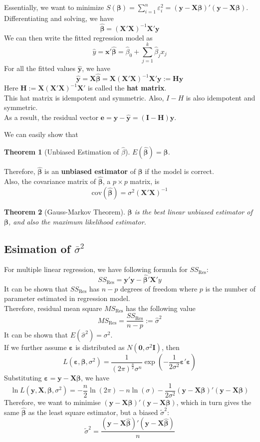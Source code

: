 \documentclass[11pt]{article}
\newcommand{\cov}{\mathrm{cov}}
\newtheorem{theorem}{Theorem}[section]
\theoremstyle{definition}
\begin{document}
Essentially, we want to minimize $S(\bm{\beta})=\sum_{i=1}^n \varepsilon_i^2 = (\bm{y}-\bm{X\beta})'(\bm{y}-\bm{X\beta})$. Differentiating and solving, we have
\[
\hat{\bm{\beta}} = (\bm{X}'\bm{X})^{-1}\bm{X}'\bm{y}
\]
We can then write the fitted regression model as
\[
\hat{y} = \bm{x}'\bm{\hat{\beta}} = \hat{\beta}_0+\sum_{j=1}^k \hat{\beta}_jx_j
\]
For all the fitted values $\bm{\hat{y}}$, we have
\[
\bm{\hat{y}} = \bm{X\hat{\beta}} = \bm{X}(\bm{X}'\bm{X})^{-1}\bm{X}'\bm{y} :=\bm{Hy}
\]
Here $\bm{H}:=\bm{X}(\bm{X}'\bm{X})^{-1}\bm{X}'$ is called the \textbf{hat matrix}.\\
This hat matrix is idempotent and symmetric. Also, $I-H$ is also idempotent and symmetric.\\

As a result, the residual vector $\bm{e}=\bm{y}-\bm{\hat{y}} = (\bm{I}-\bm{H})\bm{y}$.

We can easily show that 
\begin{theorem}[Unbiased Estimation of {$\hat{\beta}$}]
\normalfont $E(\bm{\hat{\beta}})=\bm{\beta}$. 
\end{theorem}
Therefore, $\bm{\hat{\beta}}$ is an \textbf{unbiased estimator} of $\bm{\beta}$ if the model is correct.\\
Also, the covariance matrix of $\bm{\hat{\beta}}$, a $p\times p$ matrix, is
\[
\cov(\bm{\hat{\beta}}) = \sigma^2(\bm{X}'\bm{X})^{-1}
\]
\begin{theorem}[Gauss-Markov Theorem]
\normalfont $\bm{\hat{\beta}}$  is the best linear unbiased estimator of $\bm{\beta}$, and also the maximum likelihood estimator.
\end{theorem}
\subsection{Esimation of {$\bar{\sigma}^2$}}
For multiple linear regression, we have following formula for $SS_\text{Res}$:
\[
SS_\text{Res}=\bm{y}'\bm{y}-\hat{\bm{\beta}}'\bm{X}'y
\]
It can be shown that $SS_\text{Res}$ has $n-p$ degrees of freedom where $p$ is the number of parameter estimated in regression model.\\
Therefore, residual mean square $MS_\text{Res}$ has the following value
\[
MS_\text{Res}=\frac{SS_\text{Res}}{n-p}:=\hat{\sigma}^2
\]
It can be shown that $E(\hat{\sigma}^2)=\sigma^2$.\\
If we further assume $\bm{\varepsilon}$ is distributed as $N(\bm{0},\sigma^2\bm{I})$, then
\[
L(\bm{\varepsilon}, \bm{\beta},\sigma^2)=\frac{1}{(2\pi)^{\frac{n}{2}}\sigma^n}\exp(-\frac{1}{2\sigma^2}\bm{\varepsilon}'\bm{\varepsilon})
\]
Substituting $\bm{\varepsilon}=\bm{y}-\bm{X\beta}$, we have
\[
\ln L(\bm{y},\bm{X}, \bm{\beta}, \sigma^2)=-\frac{n}{2}\ln (2\pi)-n\ln(\sigma)-\frac{1}{2\sigma^2}(\bm{y}-\bm{X\beta})'(\bm{y}-\bm{X\beta})
\]
Therefore, we want to minimise $(\bm{y}-\bm{X\beta})'(\bm{y}-\bm{X\beta})$, which in turn gives the same $\hat{\bm{\beta}}$ as the least square estimator, but a biased $\tilde{\sigma}^2$:
\[
\tilde{\sigma}^2 = \frac{(\bm{y}-\bm{X\hat{\beta}})'(\bm{y}-\bm{X\hat{\beta}})}{n}
\]
\end{document}
